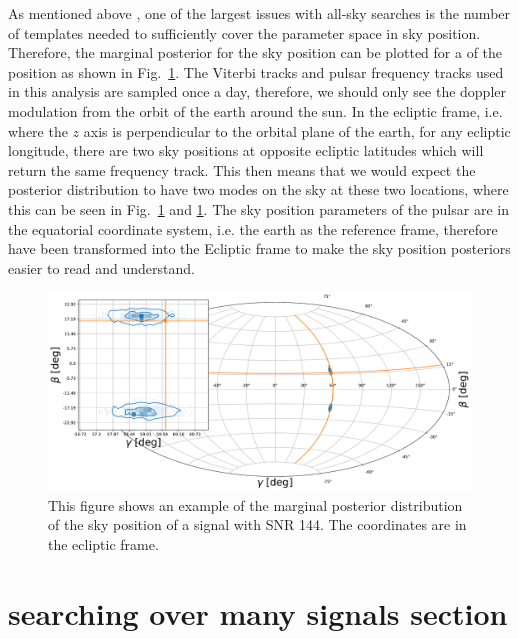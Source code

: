 As mentioned above , one of the largest issues with all-sky searches is the number of templates needed to sufficiently cover the parameter space in sky position. 
Therefore, the marginal posterior for the sky position can be plotted for a  of the position as shown in Fig.~\ref{}.
The Viterbi tracks and pulsar frequency tracks used in this analysis are sampled once a day, therefore, we should only see the doppler modulation from the orbit of the earth around the sun.
In the ecliptic frame, i.e. where the $z$ axis is perpendicular to the orbital plane of the earth, for any ecliptic longitude, there are two sky positions at opposite ecliptic latitudes which will return the same frequency track. 
This then means that we would expect the posterior distribution to have two modes on the sky at these two locations, where this can be seen in Fig.~\ref{} and \ref{}.
The sky position parameters of the pulsar are in the equatorial coordinate system, i.e. the earth as the reference frame, therefore have been transformed into the Ecliptic frame to make the sky position posteriors easier to read and understand.
%
\begin{figure}
    \centering
    \includegraphics[width=\linewidth]{C5_parameter/skypos_ecliptic.pdf}
    \caption[Example of posterior of sky position]{This figure shows an example of the marginal posterior distribution of the sky position of a signal with \gls{SNR} 144. The coordinates are in the ecliptic frame.}
    \label{par_est:results:example_posterier}
    
\end{figure}
%

\section{searching over many signals section }

